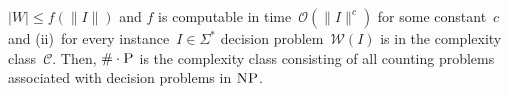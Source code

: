 \documentclass{svproc}
\newcommand{\bigO}[1]{\ensuremath{{\mathcal O}(#1)}}
\newcommand{\CCard}[1]{\|#1\|}
\newcommand{\Card}[1]{\left|#1\right|}
\renewcommand{\P}{\ensuremath{\textsc{P}}\xspace}
\newcommand{\NP}{\ensuremath{\textsc{NP}}\xspace}
\newcommand{\WWW}{\ensuremath{\mathcal{W}}}%
\newcommand{\mtext}[1]{\ensuremath{\mathcal{#1}}}
\newcommand{\cnt}[0]{\ensuremath{\#}}
\newcommand{\cntc}[0]{\ensuremath{\cnt\cdot}}
\begin{document}
$\Card{W} \leq f(\CCard{I})$ and $f$ is computable in
time~$\bigO{\CCard{I}^c}$ for some constant~$c$ and (ii)~for every
instance~$I \in \Sigma^*$ decision problem~$\WWW(I)$ is in the complexity class~$\mtext{C}$.
Then, $\cntc\P$ is the complexity class consisting of all counting
problems associated with decision problems in \NP.
%
%
\end{document}
